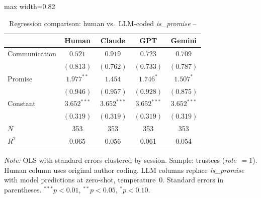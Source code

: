 \begin{table}
    \centering
    \caption{Regression comparison: human vs.\ LLM-coded \textit{is\_promise} -- \citet{ederer_schneider_2022}}
    \label{tab:ederer_regression}
    \begin{adjustbox}{max width=0.82\linewidth}
    \small
    \begin{tabular}{lcccc}
        \toprule
          & Human & Claude & GPT & Gemini \\
        \midrule
        Communication & $0.521$ & $0.919$ & $0.723$ & $0.709$ \\
         & $(0.813)$ & $(0.762)$ & $(0.733)$ & $(0.787)$ \\
        Promise & $1.977^{**}$ & $1.454$ & $1.746^{*}$ & $1.507^{*}$ \\
         & $(0.946)$ & $(0.957)$ & $(0.928)$ & $(0.875)$ \\
        Constant & $3.652^{***}$ & $3.652^{***}$ & $3.652^{***}$ & $3.652^{***}$ \\
         & $(0.319)$ & $(0.319)$ & $(0.319)$ & $(0.319)$ \\
        \midrule
        $N$ & 353 & 353 & 353 & 353 \\
        $R^2$ & 0.065 & 0.056 & 0.061 & 0.054 \\
        \bottomrule
    \end{tabular}
    \end{adjustbox}
    \vspace{0.2cm}
    \begin{minipage}{0.82\linewidth}
        \footnotesize
        \textit{Note:} OLS with standard errors clustered by session. Sample: trustees (\textit{role}~$= 1$). Human column uses original author coding. LLM columns replace \textit{is\_promise} with model predictions at zero-shot, temperature~0. Standard errors in parentheses. $^{***}p<0.01$, $^{**}p<0.05$, $^{*}p<0.10$.
    \end{minipage}
\end{table}